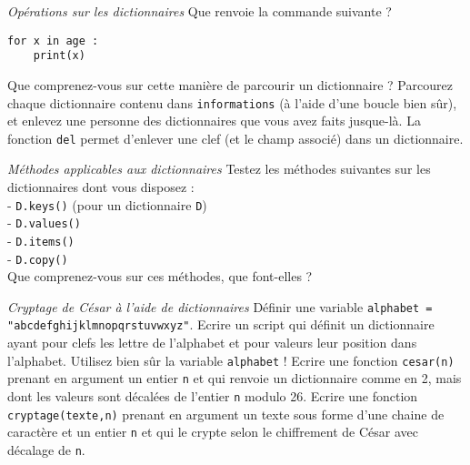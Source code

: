 \ques \textit{Opérations sur les dictionnaires}
\ssques Que renvoie la commande suivante ?
\begin{verbatim}
for x in age :
    print(x)
\end{verbatim}
Que comprenez-vous sur cette manière de parcourir un dictionnaire ?
\ssques Parcourez chaque dictionnaire contenu dans \texttt{informations} (à l'aide d'une boucle bien sûr), et enlevez une personne des dictionnaires que vous avez faits jusque-là. La fonction \texttt{del} permet d'enlever une clef (et le champ associé) dans un dictionnaire.

\newpage
\ques \textit{Méthodes applicables aux dictionnaires}
Testez les méthodes suivantes sur les dictionnaires dont vous disposez : \\
- \texttt{D.keys()} (pour un dictionnaire \texttt{D})\\
- \texttt{D.values()} \\
- \texttt{D.items()} \\
- \texttt{D.copy()} \\
Que comprenez-vous sur ces méthodes, que font-elles ?

\exo
\textit{Cryptage de César à l'aide de dictionnaires}
\ques  Définir une variable \texttt{alphabet = "abcdefghijklmnopqrstuvwxyz"}.
\ques Ecrire un script qui définit un dictionnaire ayant pour clefs les lettre de l'alphabet et pour valeurs leur position dans l'alphabet. Utilisez bien sûr la variable \texttt{alphabet} !
\ques Ecrire une fonction \texttt{cesar(n)} prenant en argument un entier \texttt{n} et qui renvoie un dictionnaire comme en 2, mais dont les valeurs sont décalées de l'entier \texttt{n} modulo 26.
\ques Ecrire une fonction \texttt{cryptage(texte,n)} prenant en argument un texte sous forme d'une chaine de caractère et un entier \texttt{n} et qui le crypte selon le chiffrement de César avec décalage de \texttt{n}.
